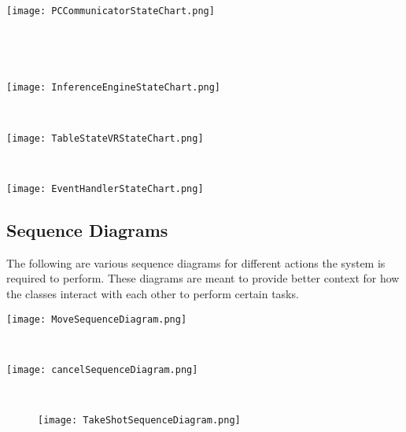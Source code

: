 \documentclass[titlepage]{article}
\begin{document}
~\vfill
\begin{center}
	\texttt{[image: PCCommunicatorStateChart.png]}
\label{fig:PCCommunicatorStateChart}
\end{center}
~\vfill
\newpage

~\vfill
\begin{center}
	\texttt{[image: InferenceEngineStateChart.png]}
\label{fig:InferenceEngineStateChart}
\end{center}
~\vfill
\newpage

\begin{multicols}{2}
\begin{center}
	\texttt{[image: TableStateVRStateChart.png]}
\label{fig:TableStateVRStateChart}
\end{center}
\columnbreak
~\vspace{15mm}
\begin{center}
	\texttt{[image: EventHandlerStateChart.png]}
\label{fig:EventHandlerStateChart}
\end{center}
\end{multicols}
\newpage

\subsection{Sequence Diagrams}
The following are various sequence diagrams for different actions the system is required to perform. These diagrams are meant to provide better context for how the classes interact with each other to perform certain tasks.\vfill
\begin{center}
	\texttt{[image: MoveSequenceDiagram.png]}
\label{fig:MoveSequenceDiagram}
\end{center}
~\vfill
\begin{center}
	\texttt{[image: cancelSequenceDiagram.png]}
\label{fig:CancelSequenceDiagram}
\end{center}
~\vfill
\newpage

\begin{sidewaysfigure}
	\begin{center}
		\texttt{[image: TakeShotSequenceDiagram.png]}
	\label{fig:TakeShotSequenceDiagram}
	\end{center}
\end{sidewaysfigure}
\end{document}
